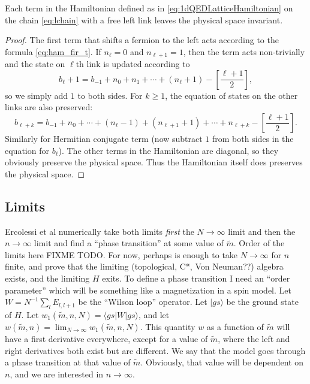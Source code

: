 	\begin{proposition}
Each term in the Hamiltonian defined as in \eqref{eq:1dQEDLatticeHamiltonian} on the chain \eqref{eq:lchain} with a free left link leaves the physical space invariant.
	\end{proposition}
	\begin{proof}
	The first term that shifts a fermion to the left acts according to the formula \ref{eq:ham_fir_t}. If $n_\ell = 0$ and $n_{\ell+1} = 1$, then the term acts non-trivially and the state on $\ell$th link is updated according to
	\[
	b_\ell + 1 = b_{-1} + n_0 + n_1 + \cdots + (n_\ell+1) -\left[\frac{\ell+1}{2}\right],
	\]
	so we simply add $1$ to both sides. For $k \geq 1$, the equation of states on the other links are also preserved:
	\[
	b_{\ell+k} = b_{-1} + n_0 + \cdots + (n_{\ell}-1) + (n_{\ell+1}+1) + \cdots + n_{\ell +k} -\left[\frac{\ell+1}{2}\right].
	\]
	Similarly for Hermitian conjugate term (now subtract $1$ from both sides in the equation for $b_{\ell}$).
	The other terms in the Hamiltonian are diagonal, so they obviously preserve the physical space. Thus the Hamiltonian itself does preserves the physical space.
	\end{proof}
	
	\subsection{Limits}
	Ercolessi et al \cite{ercolessi} numerically take both limits \emph{first} the $N\rightarrow\infty$ limit
   and then the $n\rightarrow\infty$ limit and find a ``phase transition'' at some value of $\tilde{m}$. Order of the limits here FIXME TODO.
	For now, perhaps is enough to take $N\rightarrow\infty$ for $n$ finite, and prove that the limiting (topological, C*, Von Neuman??)
	algebra exists, and the limiting $H$ exits.
	To define a phase transition I need an ``order parameter'' which will be something like a magnetization in a spin model.
	Let $W=N^{-1}\sum_l E_{l, l+1}$ be the ``Wilson loop'' operator. Let $|gs\rangle$ be the ground state of $H$.
	Let $w_1(\tilde{m}, n, N) = \langle gs | W |gs\rangle$, and let $w(\tilde{m}, n)=\lim_{N\rightarrow\infty} w_1(\tilde{m}, n, N)$.
	 This quantity $w$ as a function of $\tilde{m}$ will have a first derivative everywhere,
	except for a value of $\tilde{m}$, where the left and right derivatives both exist but are different.
	We say that the model goes through a phase transition at that value of $\tilde{m}$. Obviously, that value will be dependent on $n$,
	and we are interested in $n\rightarrow\infty$.
	
